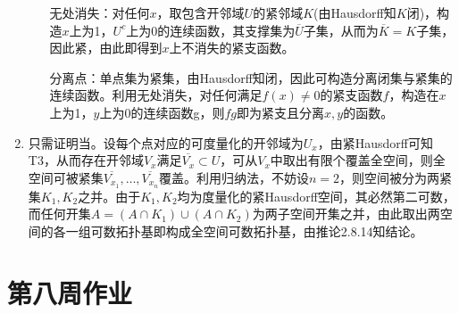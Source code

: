 \documentclass[a4paper,UTF8,fontset=windows]{ctexart}
\begin{document}
\begin{enumerate}[(1)]
\begin{enumerate}[(a)]
    无处消失：对任何$x$，取包含开邻域$U$的紧邻域$K$(由Hausdorff知$K$闭)，构造$x$上为1，$U^c$上为0的连续函数，其支撑集为$\overline{U}$子集，从而为$\overline{K}=K$子集，因此紧，由此即得到$x$上不消失的紧支函数。
    
    分离点：单点集为紧集，由Hausdorff知闭，因此可构造分离闭集与紧集的连续函数。利用无处消失，对任何满足$f(x)\ne0$的紧支函数$f$，构造在$x$上为1，$y$上为0的连续函数g，则$fg$即为紧支且分离$x,y$的函数。
    \end{enumerate}
    
    \item
    只需证明当。设每个点对应的可度量化的开邻域为$U_x$，由紧Hausdorff可知T3，从而存在开邻域$V_x$满足$\overline{V_x}\subset U$，可从$V_x$中取出有限个覆盖全空间，则全空间可被紧集$\overline{V_{x_1}},\dots,\overline{V_{x_n}}$覆盖。利用归纳法，不妨设$n=2$，则空间被分为两紧集$K_1,K_2$之并。由于$K_1,K_2$均为度量化的紧Hausdorff空间，其必然第二可数，而任何开集$A=(A\cap K_1) \cup (A\cap K_2)$为两子空间开集之并，由此取出两空间的各一组可数拓扑基即构成全空间可数拓扑基，由推论2.8.14知结论。
\end{enumerate}

\section{第八周作业}
\end{document}
